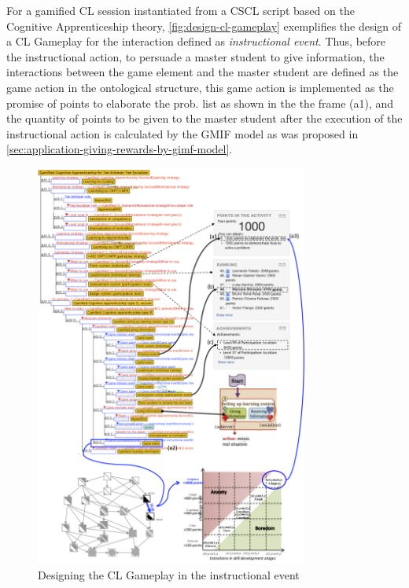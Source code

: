 For a gamified CL session instantiated from a CSCL script based on the Cognitive Apprenticeship theory, \autoref{fig:design-cl-gameplay} exemplifies the design of a CL Gameplay for the interaction  defined as \emph{instructional event}.
Thus, before the instructional action, to persuade a master student to give information, the interactions between the game element and the master student are defined as the game action  in the ontological structure, this game action is implemented as the promise of points to elaborate the prob. list as shown in the the frame (a1), and the quantity of points to be given to the master student after the execution of the instructional action  is calculated by the GMIF model as was proposed in \autoref{sec:application-giving-rewards-by-gimf-model}.

\begin{figure}[htb] 
 \caption{Designing the CL Gameplay in the instructional event }
 \label{fig:design-cl-gameplay}
 \centering 
 \includegraphics[width=0.8\textwidth]{images/chap-mechanisms-procedures/design-cl-gameplay.png}
 \fautor
\end{figure}

